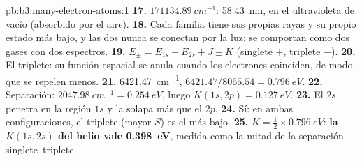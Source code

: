 \begin{solution}{pb:b3:many-electron-atoms:1}
\textbf{17.} $\qty{171134.89}{cm^{-1}}$: \qty{58.43}{nm}, en el ultravioleta de
vacío (absorbido por el aire).
\textbf{18.} Cada familia tiene sus propias rayas y su propio estado más bajo, y las
dos nunca se conectan por la luz: se comportan como dos gases con dos espectros.
\textbf{19.} $E_\pm = E_{1s} + E_{2s} + J \pm K$ (singlete $+$, triplete $-$).
\textbf{20.} El triplete: su función espacial se anula cuando los electrones coinciden,
de modo que se repelen menos.
\textbf{21.} \qty{6421.47}{cm^{-1}}, $6421.47/8065.54 = \qty{0.796}{eV}$.
\textbf{22.} Separación: $\qty{2047.98}{cm^{-1}} = \qty{0.254}{eV}$, luego $K(1s,2p) =
\qty{0.127}{eV}$.
\textbf{23.} El $2s$ penetra en la región $1s$ y la solapa más que el $2p$.
\textbf{24.} Sí: en ambas configuraciones, el triplete (mayor $S$) es el más bajo.
\textbf{25.} $K = \frac12 \times \qty{0.796}{eV}$: \textbf{la  $K(1s,2s)$ del helio vale \qty{0.398}{eV}}, medida como la mitad de la
separación singlete--triplete.
\end{solution}
